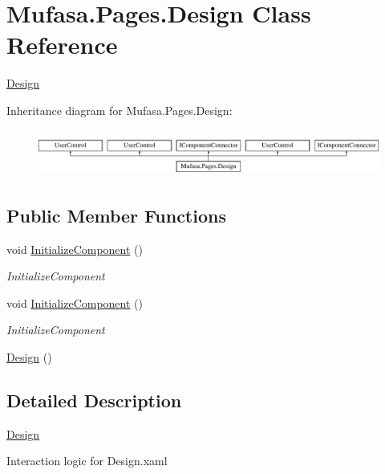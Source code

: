 \hypertarget{class_mufasa_1_1_pages_1_1_design}{\section{Mufasa.\+Pages.\+Design Class Reference}
\label{class_mufasa_1_1_pages_1_1_design}
}


\hyperlink{class_mufasa_1_1_pages_1_1_design}{Design}  


Inheritance diagram for Mufasa.\+Pages.\+Design\+:\begin{figure}[H]
\begin{center}
\leavevmode
\includegraphics[height=1.544828cm]{class_mufasa_1_1_pages_1_1_design}
\end{center}
\end{figure}
\subsection*{Public Member Functions}
\begin{DoxyCompactItemize}
\item 
void \hyperlink{class_mufasa_1_1_pages_1_1_design_adc1557aa2ee54e2b406a3736d11d272f}{Initialize\+Component} ()
\begin{DoxyCompactList}\small\item\em Initialize\+Component \end{DoxyCompactList}\item 
void \hyperlink{class_mufasa_1_1_pages_1_1_design_adc1557aa2ee54e2b406a3736d11d272f}{Initialize\+Component} ()
\begin{DoxyCompactList}\small\item\em Initialize\+Component \end{DoxyCompactList}\item 
\hyperlink{class_mufasa_1_1_pages_1_1_design_ab83a09169057ed43116ca47c46e62db7}{Design} ()
\end{DoxyCompactItemize}


\subsection{Detailed Description}
\hyperlink{class_mufasa_1_1_pages_1_1_design}{Design} 

Interaction logic for Design.\+xaml 

